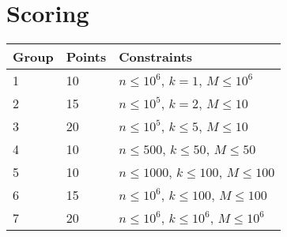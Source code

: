\section*{Scoring}
\begin{tabular}{|l|l|l|}
    \hline
    Group & Points & Constraints \\ \hline
    1     &  10  & $n \leq 10^6$, $k = 1$, $M \leq 10^6$ \\ \hline
    2     &  15  & $n \leq 10^5$, $k = 2$, $M \leq 10$ \\ \hline
    3     &  20  & $n \leq 10^5$, $k \leq 5$, $M \leq 10$ \\ \hline
    4     &  10  & $n \leq 500$, $k \leq 50$, $M \leq 50$ \\ \hline
    5     &  10  & $n \leq 1000$, $k \leq 100$, $M \leq 100$ \\ \hline
    6     &  15  & $n \leq 10^6$, $k \leq 100$, $M \leq 100$ \\ \hline
    7     &  20  & $n \leq 10^6$, $k \leq 10^6$, $M \leq 10^6$ \\ \hline
\end{tabular}

